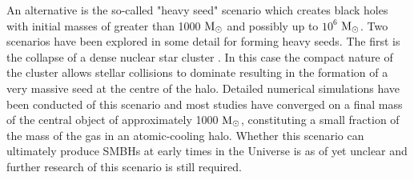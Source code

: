 \documentclass[graphics, twocolumn, usenatbib]{mn2e}
\newcommand{\msolar} {$\rm{M_{\odot}}~$}
\newcommand{\msolarc} {$\rm{M_{\odot}}$}
\begin{document}
\indent An alternative is the so-called "heavy seed" scenario which creates black holes with initial masses of
greater than 1000 \msolar and possibly up to $10^{6}$ \msolarc. Two scenarios have been
explored in some detail for forming heavy seeds. The first is the collapse of a dense
nuclear star cluster \citep{PortegiesZwart_2004, Freitag_2008, Omukai_2008,Devecchi_2008, Merritt_2008,
  Davies_2011, Lupi_2014}. In this case the compact nature of the cluster allows
stellar collisions to dominate resulting in the formation of a very massive seed at the
centre of the halo. Detailed numerical simulations have been conducted \cite[e.g.][]{Katz_2015,
  Reinoso_2018} of this scenario and
most studies have converged on a final mass of the central object of approximately 1000 \msolarc, constituting a small fraction of the mass of the gas in an atomic-cooling halo.
Whether this scenario can ultimately produce SMBHs at early times in the Universe is as of yet
unclear and further research of this scenario is still required. \\
\end{document}
